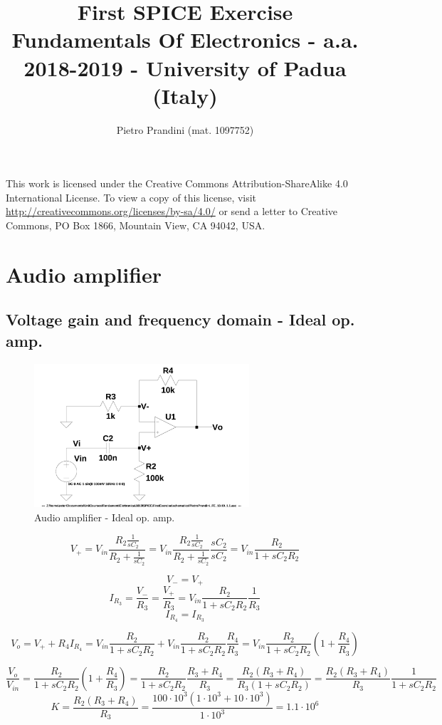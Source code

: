 \documentclass[10pt,a4paper]{article}
\title{First SPICE Exercise\\{\small{Fundamentals Of Electronics - a.a. 2018-2019 -
University of Padua (Italy)}}}
\author{Pietro Prandini (mat. 1097752)}
\begin{document}
\maketitle

\begin{center}
\tiny{This work is licensed under the Creative Commons Attribution-ShareAlike
 4.0 International License. To view a copy of this license, visit
 \href{http://creativecommons.org/licenses/by-sa/4.0/}{http://creativecommons.org/licenses/by-sa/4.0/}
or send a letter to Creative Commons, PO Box 1866, Mountain View, CA 94042,
USA.}
\end{center}

\section{Audio amplifier}
\subsection{Voltage gain and frequency domain - Ideal op. amp.}
\begin{figure}[h]
  \centering
  \includegraphics[width=8cm]{schematics/1d1.jpg}
  \caption{Audio amplifier - Ideal op. amp.}
  \label{1d1}
\end{figure}

$$V_+ = V_{in}\frac{R_2\frac{1}{sC_2}}{R_2+\frac{1}{sC_2}} =
V_{in}\frac{R_2\frac{1}{sC_2}}{R_2+\frac{1}{sC_2}}\frac{sC_2}{sC_2} =
V_{in}\frac{R_2}{1+sC_2R_2}$$

$$V_- = V_+$$
$$I_{R_3} = \frac{V_-}{R_3} = \frac{V_+}{R_3} = V_{in}\frac{R_2}{1+sC_2R_2}\frac{1}{R_3}$$
$$I_{R_4} = I_{R_3}$$

$$V_o = V_+ + R_4I_{R_4} =
V_{in}\frac{R_2}{1+sC_2R_2} + V_{in}\frac{R_2}{1+sC_2R_2}\frac{R_4}{R_3} =
V_{in}\frac{R_2}{1+sC_2R_2}\left(1+\frac{R_4}{R_3}\right)$$

$$\frac{V_o}{V_{in}} = \frac{R_2}{1+sC_2R_2}\left(1+\frac{R_4}{R_3}\right) =
\frac{R_2}{1+sC_2R_2}\frac{R_3+R_4}{R_3} = \frac{R_2(R_3+R_4)}{R_3(1+sC_2R_2)} =
\frac{R_2(R_3+R_4)}{R_3}\frac{1}{1+sC_2R_2}$$
$$ K = \frac{R_2(R_3+R_4)}{R_3} = \frac{100 \cdot 10^3(1 \cdot 10^3 + 10 \cdot 10^3)}{1 \cdot 10^3} = 1.1 \cdot 10^6$$
\end{document}
